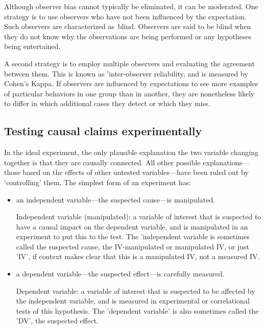 \begin{refsection}
Although observer bias cannot typically be eliminated, it can be moderated. One strategy is to use observers who have not been influenced by the expectation. Such observers are characterized as blind. Observers are said to be blind when they do not know why the observations are being performed or any hypotheses being entertained.

A second strategy is to employ multiple observers and evaluating the agreement between them. This is known as 'inter-observer reliability, and is measured by Cohen's Kappa. If observers are influenced by expectations to see more examples of particular behaviors in one group than in another, they are nonetheless likely to differ in which additional cases they detect or which they miss.

\subsection{Testing causal claims experimentally}
\label{testingcausalclaimsexperimentally}

In the ideal experiment, the only plausible explanation the two variable changing together is that they are causally connected. All other possible explanations---those based on the effects of other untested variables---have been ruled out by `controlling' them. The simplest form of an experiment has:

\begin{itemize}
\item an independent variable---the suspected cause---is manipulated.
\begin{thesis}
Independent variable (manipulated): a variable of interest that is suspected to have a causal impact on the dependent variable, and is manipulated in an experiment to put this to the test.\newline
The 'independent variable is sometimes called the suspected cause, the IV-manipulated or manipulated IV, or just 'IV', if context makes clear that this is a manipulated IV, not a measured IV.
\end{thesis}

\item a dependent variable---the suspected effect---is carefully measured. \begin{thesis}
Dependent variable: a variable of interest that is suspected to be affected by the independent variable, and is measured in experimental or correlational tests of this hypothesis.
\newline
The 'dependent variable' is also sometimes called the 'DV', the suspected effect.
\end{thesis}


\end{itemize}
\end{refsection}
